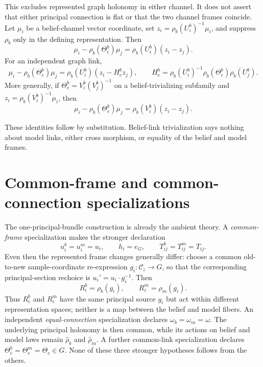 This excludes represented graph holonomy in either channel.  It does not assert that either
principal connection is flat or that the two channel frames coincide.  Let $\mu_i$ be a
belief-channel vector coordinate, set $z_i=\rho_b(U_i^b)^{-1}\mu_i$, and suppress $\rho_b$ only in
the defining representation.  Then
\begin{equation}
\mu_i-\rho_b(\Theta_e^b)\mu_j
=\rho_b(U_i^b)(z_i-z_j).
\label{eq:geo-trivialized-residual}
\end{equation}
For an independent graph link,
\begin{equation}
\mu_i-\rho_b(\Theta_e^b)\mu_j
=\rho_b(U_i^b)(z_i-H_e^bz_j),
\qquad
H_e^b=\rho_b(U_i^b)^{-1}\rho_b(\Theta_e^b)\rho_b(U_j^b).
\label{eq:geo-regime-two-residual}
\end{equation}
More generally, if $\Theta_e^b=V_i^b(V_j^b)^{-1}$ on a belief-trivializing subfamily and
$z_i=\rho_b(V_i^b)^{-1}\mu_i$, then
\begin{equation}
\mu_i-\rho_b(\Theta_e^b)\mu_j
=\rho_b(V_i^b)(z_i-z_j).
\label{eq:geo-subfamily-trivialized-residual}
\end{equation}

These identities follow by substitution.  Belief-link trivialization says nothing about model
links, either cross morphism, or equality of the belief and model frames.

\section{Common-frame and common-connection specializations}
\label{sec:geo-diagonal}

The one-principal-bundle construction is already the ambient theory.  A \emph{common-frame}
specialization makes the stronger declaration
\begin{equation}
u_i^b=u_i^m=u_i,
\qquad h_i=e_G,
\qquad T_{ij}^b=T_{ij}^m=T_{ij}.
\label{eq:geo-diagonal-principal}
\end{equation}
Even then the represented frame changes generally differ:
choose a common old-to-new sample-coordinate re-expression $g_i:\mathcal C_i\to G$, so that the
corresponding principal-section rechoice is $u_i'=u_i\cdot g_i^{-1}$.  Then
\begin{equation}
R_i^b=\rho_b(g_i),
\qquad
R_i^m=\rho_m(g_i).
\label{eq:geo-represented-frame-change}
\end{equation}
Thus $R_i^b$ and $R_i^m$ have the same principal source $g_i$ but act within different
representation spaces; neither is a map between the belief and model fibers.
An independent \emph{equal-connection} specialization declares $\omega_b=\omega_m=\omega$.  The
underlying principal holonomy is then common, while its actions on belief and model laws remain
$\widehat\rho_b$ and $\widehat\rho_m$.  A further common-link specialization declares
$\Theta_e^b=\Theta_e^m=\Theta_e\in G$.  None of these three stronger hypotheses follows from the
others. 

